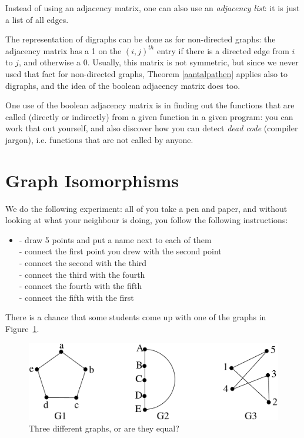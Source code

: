 Instead of using an adjacency matrix, one can also use an {\em
adjacency list}: it is just a list of all edges.


The representation of digraphs can be done as for non-directed graphs:
the adjacency matrix has a 1 on the $(i,j)^{th}$ entry if there is a
directed edge from $i$ to $j$, and otherwise a 0. Usually, this matrix
is not symmetric, but since we never used that fact for non-directed
graphs, Theorem \ref{aantalpathen} applies also to digraphs, and the
idea of the boolean adjacency matrix does too.

One use of the boolean adjacency matrix is in finding out the
functions that are called (directly or indirectly) from a given
function in a given program: you can work that out yourself, and also
discover how you can detect {\em dead code} (compiler jargon),
i.e. functions that are not called by anyone. 


\section{Graph Isomorphisms}

We do the following experiment: all of you take a pen and paper, and
without looking at what your neighbour is doing, you follow the
following instructions:

\begin{itemize}
\item[]
- draw 5 points and put a name next to each of them \\
- connect the first point you drew with the second point\\
- connect the second with the third\\
- connect the third with the fourth\\
- connect the fourth with the fifth\\
- connect the fifth with the first\\
\end{itemize}

There is a chance that some students come up with one of the graphs in
Figure~\ref{experiment1}.

\begin{figure}[ht]
\begin{center}
\includegraphics[width=0.6\linewidth,keepaspectratio]{experiment1}
\end{center}
\caption{Three different graphs, or are they equal?\label{experiment1}}
\end{figure}

